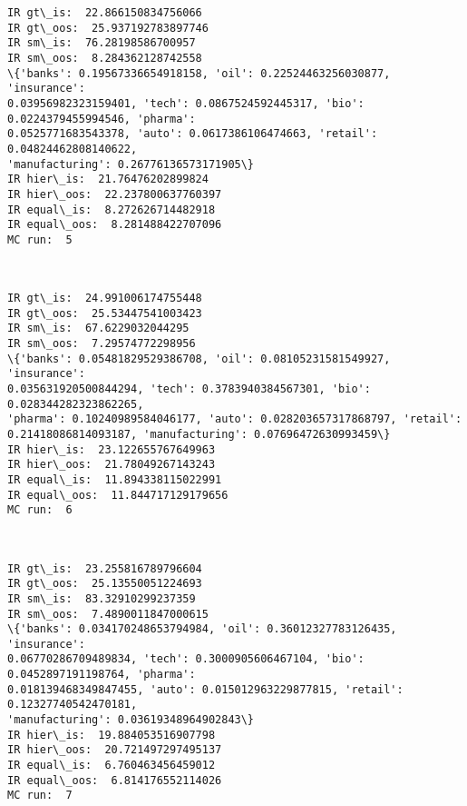 \documentclass[11pt]{article}
\begin{document}
    \begin{Verbatim}[commandchars=\\\{\},fontsize=\footnotesize]
IR gt\_is:  22.866150834756066
IR gt\_oos:  25.937192783897746
IR sm\_is:  76.28198586700957
IR sm\_oos:  8.284362128742558
\{'banks': 0.19567336654918158, 'oil': 0.22524463256030877, 'insurance':
0.03956982323159401, 'tech': 0.0867524592445317, 'bio': 0.0224379455994546, 'pharma':
0.0525771683543378, 'auto': 0.0617386106474663, 'retail': 0.04824462808140622,
'manufacturing': 0.26776136573171905\}
IR hier\_is:  21.76476202899824
IR hier\_oos:  22.237800637760397
IR equal\_is:  8.272626714482918
IR equal\_oos:  8.281488422707096
MC run:  5

    \end{Verbatim}

    \begin{center}
    \end{center}
    { \hspace*{\fill} \\}
    
    \begin{Verbatim}[commandchars=\\\{\},fontsize=\footnotesize]
IR gt\_is:  24.991006174755448
IR gt\_oos:  25.53447541003423
IR sm\_is:  67.6229032044295
IR sm\_oos:  7.29574772298956
\{'banks': 0.05481829529386708, 'oil': 0.08105231581549927, 'insurance':
0.035631920500844294, 'tech': 0.3783940384567301, 'bio': 0.028344282323862265,
'pharma': 0.10240989584046177, 'auto': 0.028203657317868797, 'retail':
0.21418086814093187, 'manufacturing': 0.07696472630993459\}
IR hier\_is:  23.122655767649963
IR hier\_oos:  21.78049267143243
IR equal\_is:  11.894338115022991
IR equal\_oos:  11.844717129179656
MC run:  6

    \end{Verbatim}

    \begin{center}
    \end{center}
    { \hspace*{\fill} \\}
    
    \begin{Verbatim}[commandchars=\\\{\},fontsize=\footnotesize]
IR gt\_is:  23.255816789796604
IR gt\_oos:  25.13550051224693
IR sm\_is:  83.32910299237359
IR sm\_oos:  7.4890011847000615
\{'banks': 0.034170248653794984, 'oil': 0.36012327783126435, 'insurance':
0.06770286709489834, 'tech': 0.3000905606467104, 'bio': 0.0452897191198764, 'pharma':
0.018139468349847455, 'auto': 0.015012963229877815, 'retail': 0.12327740542470181,
'manufacturing': 0.03619348964902843\}
IR hier\_is:  19.884053516907798
IR hier\_oos:  20.721497297495137
IR equal\_is:  6.760463456459012
IR equal\_oos:  6.814176552114026
MC run:  7

    \end{Verbatim}
\end{document}
